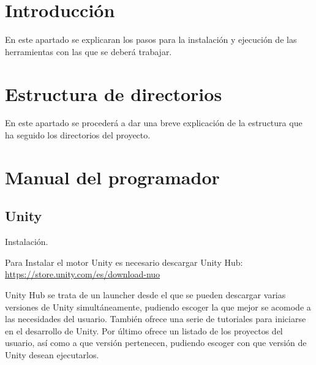 
\section{Introducción}
En este apartado se explicaran los pasos para la instalación y ejecución de las herramientas con las que se deberá trabajar.

\section{Estructura de directorios}
En este apartado se procederá a dar una breve explicación de la estructura que ha seguido los directorios del proyecto.\\




\section{Manual del programador}
\subsection{Unity}
Instalación.

Para Instalar el motor Unity es necesario descargar Unity Hub: \url{https://store.unity.com/es/download-nuo}

Unity Hub se trata de un launcher desde el que se pueden descargar varias versiones de Unity simultáneamente, pudiendo escoger la que mejor se acomode a las necesidades del usuario. También ofrece una serie de tutoriales para iniciarse en el desarrollo de Unity. Por último ofrece un listado de los proyectos del usuario, así como a que versión pertenecen, pudiendo escoger con que versión de Unity desean ejecutarlos.

